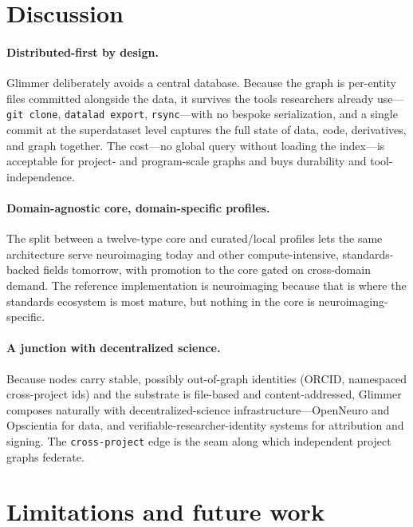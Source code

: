 \documentclass[preprint]{glimmer-paper}
\newcommand{\code}[1]{\texttt{#1}}
\begin{document}
\section{Discussion}
\label{sec:discussion}

\paragraph{Distributed-first by design.} Glimmer deliberately avoids a central database.
Because the graph is per-entity files committed alongside the data, it survives the tools
researchers already use---\code{git clone}, \code{datalad export}, \code{rsync}---with no
bespoke serialization, and a single commit at the superdataset level captures the full
state of data, code, derivatives, and graph together. The cost---no global query without
loading the index---is acceptable for project- and program-scale graphs and buys
durability and tool-independence.

\paragraph{Domain-agnostic core, domain-specific profiles.} The split between a
twelve-type core and curated/local profiles lets the same architecture serve neuroimaging
today and other compute-intensive, standards-backed fields tomorrow, with promotion to the
core gated on cross-domain demand. The reference implementation is neuroimaging because
that is where the standards ecosystem is most mature, but nothing in the core is
neuroimaging-specific.

\paragraph{A junction with decentralized science.} Because nodes carry stable, possibly
out-of-graph identities (ORCID, namespaced cross-project ids) and the substrate is
file-based and content-addressed, Glimmer composes naturally with decentralized-science
infrastructure---OpenNeuro and Opscientia for data, and verifiable-researcher-identity
systems for attribution and signing. The \code{cross-project} edge is the seam along which
independent project graphs federate.

\section{Limitations and future work}
\label{sec:limits}
\end{document}
